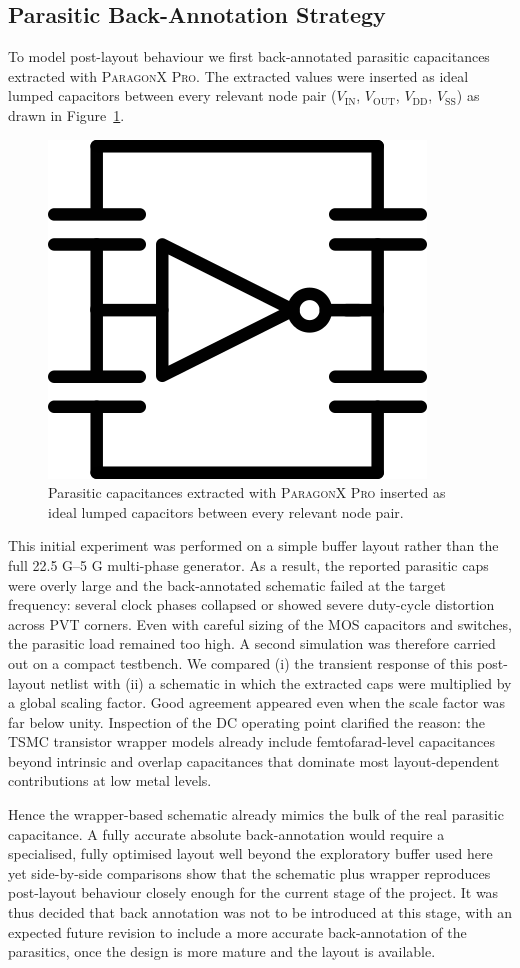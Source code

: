 \subsection{Parasitic Back-Annotation Strategy}

To model post-layout behaviour we first back-annotated parasitic capacitances extracted with \textsc{ParagonX Pro}.%
The extracted values were inserted as ideal lumped capacitors between every relevant node pair (\(V_\text{IN}\), \(V_\text{OUT}\), \(V_\text{DD}\), \(V_\text{SS}\)) as drawn in Figure~\ref{fig:back_annotation}.

\begin{figure}
  \centering
  \includegraphics[width=0.2\linewidth]{figures/Schematics/BackAnnotation.png}
  \caption{Parasitic capacitances extracted with \textsc{ParagonX Pro} inserted as ideal lumped capacitors between every relevant node pair.}
  \label{fig:back_annotation}
\end{figure}

This initial experiment was performed on a simple buffer layout rather than the full 22.5 G–5 G multi-phase generator.
As a result, the reported parasitic caps were overly large and the back-annotated schematic failed at the target frequency: several clock phases collapsed or showed severe duty-cycle distortion across PVT corners.
Even with careful sizing of the MOS capacitors and switches, the parasitic load remained too high.
A second simulation was therefore carried out on a compact testbench.  
We compared (i) the transient response of this post-layout netlist with (ii) a schematic in which the extracted caps were multiplied by a global scaling factor.  
Good agreement appeared even when the scale factor was far below unity.  
Inspection of the DC operating point clarified the reason: the TSMC transistor wrapper models already include femtofarad-level capacitances beyond intrinsic and overlap capacitances that dominate most layout-dependent contributions at low metal levels.

Hence the wrapper-based schematic already mimics the bulk of the real parasitic capacitance.  
A fully accurate absolute back-annotation would require a specialised, fully optimised layout well beyond the exploratory buffer used here yet side-by-side comparisons show that the schematic plus wrapper reproduces post-layout behaviour closely enough for the current stage of the project.
It was thus decided that back annotation was not to be introduced at this stage, with an expected future revision to include a more accurate back-annotation of the parasitics, once the design is more mature and the layout is available.

